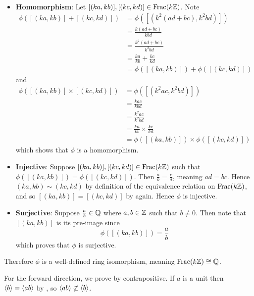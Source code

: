 \begin{questions}
\begin{partquestions}{\alph*}
\begin{itemize}
            \item \textbf{Homomorphism}: Let $[(ka, kb)], [(kc, kd)] \in \mathrm{Frac}(k\mathbb{Z})$. Note
            \begin{align*}
                \phi([(ka,kb)] + [(kc,kd)]) &= \phi([(k^2(ad+bc), k^2bd)])\\
                &= \frac{k(ad+bc)}{kbd}\\
                &= \frac{k^2(ad+bc)}{k^2bd}\\
                &= \frac {ka}{kb} + \frac {kc}{kd}\\
                &= \phi([(ka,kb)]) + \phi([(kc,kd)])
            \end{align*}
            and
            \begin{align*}
                \phi([(ka,kb)] \times [(kc,kd)]) &= \phi([(k^2ac, k^2bd)])\\
                &= \frac{kac}{kbd}\\
                &= \frac{k^2ac}{k^2bd}\\
                &= \frac {ka}{kb} \times \frac {kc}{kd}\\
                &= \phi([(ka,kb)]) \times \phi([(kc,kd)])
            \end{align*}
            which shows that $\phi$ is a homomorphism.
            
            \item \textbf{Injective}: Suppose $[(ka, kb)], [(kc, kd)] \in \mathrm{Frac}(k\mathbb{Z})$ such that $\phi([(ka, kb)]) = \phi([(kc, kd)])$. Then $\frac ab = \frac cd$, meaning $ad = bc$. Hence $(ka, kb) \mathrel{\sim} (kc, kd)$ by definition of the equivalence relation on $\mathrm{Frac}(k\mathbb{Z})$, and so $[(ka, kb)] = [(kc, kd)]$ by  again. Hence $\phi$ is injective.
            
            \item \textbf{Surjective}: Suppose $\frac ab \in \mathbb{Q}$ where $a, b \in \mathbb{Z}$ such that $b \neq 0$. Then note that $[(ka, kb)]$ is its pre-image since
            \[
                \phi([(ka, kb)]) = \frac ab
            \]
            which proves that $\phi$ is surjective.
        \end{itemize}
        Therefore $\phi$ is a well-defined ring isomorphism, meaning $\mathrm{Frac}(k\mathbb{Z}) \cong \mathbb{Q}$.
    \end{partquestions}

    \item For the forward direction, we prove by contrapositive. If $a$ is a unit then $\left\langle b\right\rangle = \left\langle ab\right\rangle$ by , so $\left\langle ab\right\rangle \not\subset \left\langle b\right\rangle$.
    

\end{questions}
